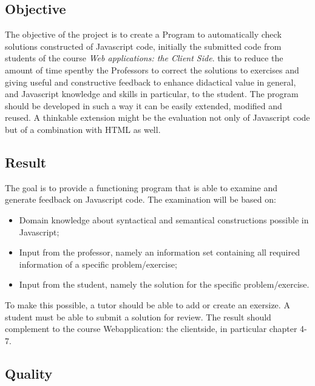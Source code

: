 \documentclass{article}
\begin{document}
\subsection{Objective}

The objective of the project is to create a Program to automatically check
solutions constructed of Javascript code, initially the submitted code from
students of the course {\em Web applications: the Client Side}. this to reduce
the amount of time spentby the Professors to correct the solutions to exercises
and giving useful and constructive feedback to enhance didactical value in
general, and Javascript knowledge and skills in particular, to the student. The
program should be developed in such a way it can be easily extended, modified
and reused. A thinkable extension might be the evaluation not only of
Javascript code but of a combination with HTML as well.

\subsection{Result} 

The goal is to provide a functioning program that is able to examine and 
generate feedback on Javascript code. The examination will be based on: 

\begin{itemize} \item Domain knowledge about syntactical and semantical
constructions possible in Javascript; \item Input from the professor, namely an
information set containing all required information of a specific
problem/exercise; \item Input from the student, namely the solution for the
specific problem/exercise. \end{itemize} To make this possible, a tutor should
be able to add or create an exersize. A student must be able to submit a
solution for review. The result should complement to the course Webapplication:
the clientside, in particular chapter 4-7.

\subsection{Quality} 
\end{document}
